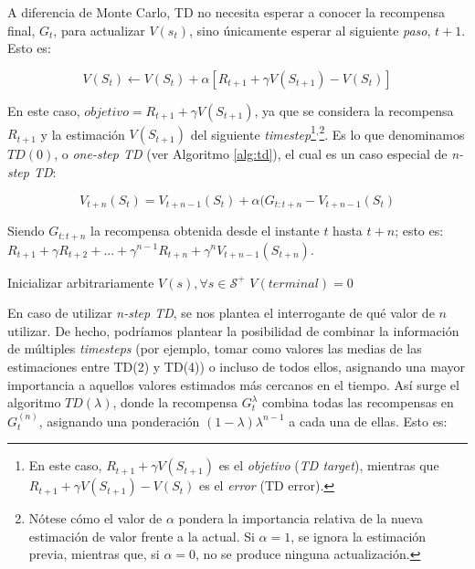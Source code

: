 A diferencia de Monte Carlo, TD no necesita esperar a conocer la recompensa final, $G_t$, para actualizar $V(s_t)$, sino únicamente esperar al siguiente \textit{paso}, $t+1$. Esto es:

\begin{equation}
    V(S_t) \leftarrow V(S_t) + \alpha[R_{t+1} + \gamma V(S_{t+1}) - V(S_t)]
\end{equation}

En este caso, $objetivo = R_{t+1} + \gamma V(S_{t+1})$, ya que se considera la recompensa $R_{t+1}$ y la estimación $V(S_{t+1})$ del siguiente \textit{timestep}\footnote{En este caso, $R_{t+1} + \gamma V(S_{t+1})$ es el \textit{objetivo} (\textit{TD target}), mientras que $R_{t+1} + \gamma V(S_{t+1}) - V(S_t)$ es el \textit{error} (TD error).}$^,$\footnote{Nótese cómo el valor de $\alpha$ pondera la importancia relativa de la nueva estimación de valor frente a la actual. Si $\alpha = 1$, se ignora la estimación previa, mientras que, si $\alpha = 0$, no se produce ninguna actualización.}. Es lo que denominamos $TD(0)$, o \textit{one-step TD} (ver Algoritmo \ref{alg:td}), el cual es un caso especial de \textit{n-step TD}:

\begin{equation}
    V_{t+n}(S_t) = V_{t+n-1}(S_t) + \alpha(G_{t:t+n} - V_{t+n-1}(S_t)
\end{equation}

Siendo $G_{t:t+n}$ la recompensa obtenida desde el instante $t$ hasta $t+n$; esto es: $R_{t+1} + \gamma R_{t+2} + ... + \gamma^{n-1} R_{t+n} + \gamma^n V_{t+n-1}(S_{t+n})$.

\begin{algorithm}
\caption{$TD(0)$, \cite{sutton2018reinforcement}}
\label{alg:td}
\DontPrintSemicolon
\LinesNumbered
\KwIn{$\pi$: la política a evaluar \newline
     $\alpha$: el \textit{step-size} $\in (0,1]$}

Inicializar arbitrariamente $V(s), \forall s \in \mathcal{S^+}$\;
$V(terminal) = 0$\;

\end{algorithm}

En caso de utilizar \textit{n-step TD}, se nos plantea el interrogante de qué valor de $n$ utilizar. De hecho, podríamos plantear la posibilidad de combinar la información de múltiples \textit{timesteps} (por ejemplo, tomar como valores las medias de las estimaciones entre TD(2) y TD(4)) o incluso de todos ellos, asignando una mayor importancia a aquellos valores estimados más cercanos en el tiempo. Así surge el algoritmo $TD(\lambda)$, donde la recompensa $G^\lambda_t$ combina todas las recompensas en $G^{(n)}_t$, asignando una ponderación $(1-\lambda)\lambda^{n-1}$ a cada una de ellas. Esto es:

